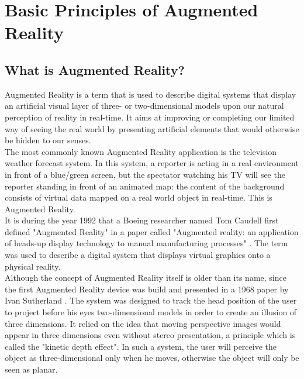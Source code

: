 \chapter{Basic Principles of Augmented Reality}
\label{cha:basic_principles}

\section{What is Augmented Reality?}
\label{sec:what_is_ar}

Augmented Reality is a term that is used to describe digital systems that display an artificial visual layer of three- or two-dimensional models upon our natural perception of reality in real-time. It aims at improving or completing our limited way of seeing the real world by presenting artificial elements that would otherwise be hidden to our senses.\\

The most commonly known Augmented Reality application is the television weather forecast system. In this system, a reporter is acting in a real environment in front of a blue/green screen, but the spectator watching his TV will see the reporter standing in front of an animated map: the content of the background consists of virtual data mapped on a real world object in real-time. This is Augmented Reality. \\

It is during the year 1992 that a Boeing researcher named Tom Caudell first defined "Augmented Reality" in a paper called "Augmented reality: an application of heads-up display technology to manual manufacturing processes" \cite{Cau92}. The term was used to describe a digital system that displays virtual graphics onto a physical reality.\\

Although the concept of Augmented Reality itself is older than its name, since the first Augmented Reality device was build and presented in a 1968 paper by Ivan Sutherland \cite{Sut68}. The system was designed to track the head position of the user to project before his eyes two-dimensional models in order to create an illusion of three dimensions. It relied on the idea that moving perspective images would appear in three dimensions even without stereo presentation, a principle which is called the "kinetic depth effect". In such a system, the user will perceive the object as three-dimensional only when he moves, otherwise the object will only be seen as planar.\\


